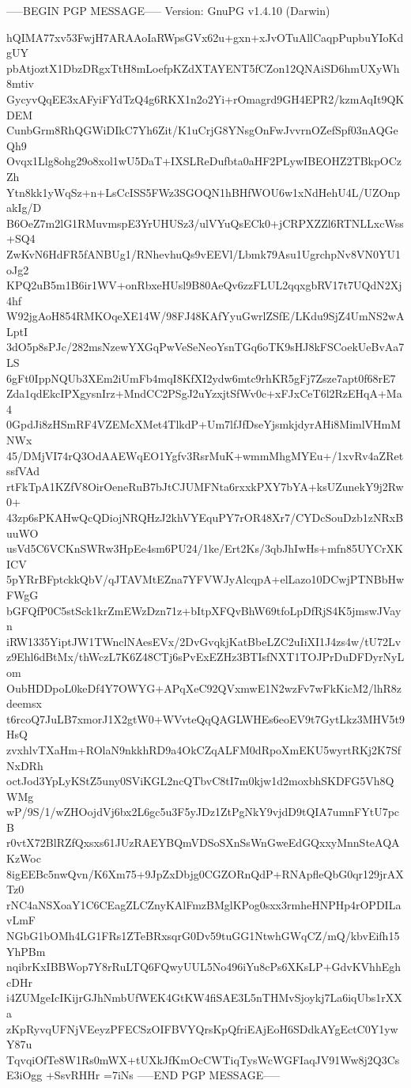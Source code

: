 -----BEGIN PGP MESSAGE-----
Version: GnuPG v1.4.10 (Darwin)

hQIMA77xv53FwjH7ARAAoIaRWpsGVx62u+gxn+xJvOTuAllCaqpPupbuYIoKdgUY
pbAtjoztX1DbzDRgxTtH8mLoefpKZdXTAYENT5fCZon12QNAiSD6hmUXyWh8mtiv
GycyvQqEE3xAFyiFYdTzQ4g6RKX1n2o2Yi+rOmagrd9GH4EPR2/kzmAqIt9QKDEM
CunbGrm8RhQGWiDIkC7Yh6Zit/K1uCrjG8YNsgOnFwJvvrnOZefSpf03nAQGeQh9
Ovqx1Llg8ohg29o8xol1wU5DaT+IXSLReDufbta0aHF2PLywIBEOHZ2TBkpOCzZh
Ytn8kk1yWqSz+n+LsCcISS5FWz3SGOQN1hBHfWOU6w1xNdHehU4L/UZOnpakIg/D
B6OeZ7m2lG1RMuvmspE3YrUHUSz3/ulVYuQsECk0+jCRPXZZl6RTNLLxcWss+SQ4
ZwKvN6HdFR5fANBUg1/RNhevhuQs9vEEVl/Lbmk79Asu1UgrchpNv8VN0YU1oJg2
KPQ2uB5m1B6ir1WV+onRbxeHUsl9B80AeQv6zzFLUL2qqxgbRV17t7UQdN2Xj4hf
W92jgAoH854RMKOqeXE14W/98FJ48KAfYyuGwrlZSfE/LKdu9SjZ4UmNS2wALptI
3dO5p8sPJc/282msNzewYXGqPwVeSeNeoYsnTGq6oTK9sHJ8kFSCoekUeBvAa7LS
6gFt0IppNQUb3XEm2iUmFb4mqI8KfXI2ydw6mtc9rhKR5gFj7Zsze7apt0f68rE7
Zda1qdEkcIPXgysnIrz+MndCC2PSgJ2uYzxjtSfWv0c+xFJxCeT6l2RzEHqA+Ma4
0GpdJi8zHSmRF4VZEMcXMet4TlkdP+Um7lfJfDseYjsmkjdyrAHi8MimlVHmMNWx
45/DMjVI74rQ3OdAAEWqEO1Ygfv3RsrMuK+wmmMhgMYEu+/1xvRv4aZRetssfVAd
rtFkTpA1KZfV8OirOeneRuB7bJtCJUMFNta6rxxkPXY7bYA+ksUZunekY9j2Rw0+
43zp6sPKAHwQcQDiojNRQHzJ2khVYEquPY7rOR48Xr7/CYDcSouDzb1zNRxBuuWO
usVd5C6VCKnSWRw3HpEe4sm6PU24/1ke/Ert2Ks/3qbJhIwHs+mfn85UYCrXKICV
5pYRrBFptckkQbV/qJTAVMtEZna7YFVWJyAlcqpA+elLazo10DCwjPTNBbHwFWgG
bGFQfP0C5stSck1krZmEWzDzn71z+bItpXFQvBhW69tfoLpDfRjS4K5jmswJVayn
iRW1335YiptJW1TWnclNAesEVx/2DvGvqkjKatBbeLZC2uIiXI1J4zs4w/tU72Lv
z9Ehl6dBtMx/thWczL7K6Z48CTj6sPvExEZHz3BTIsfNXT1TOJPrDuDFDyrNyLom
OubHDDpoL0keDf4Y7OWYG+APqXeC92QVxmwE1N2wzFv7wFkKicM2/lhR8zdeemsx
t6rcoQ7JuLB7xmorJ1X2gtW0+WVvteQqQAGLWHEs6eoEV9t7GytLkz3MHV5t9HsQ
zvxhlvTXaHm+ROlaN9nkkhRD9a4OkCZqALFM0dRpoXmEKU5wyrtRKj2K7SfNxDRh
octJod3YpLyKStZ5uny0SViKGL2ncQTbvC8tI7m0kjw1d2moxbhSKDFG5Vh8QWMg
wP/9S/1/wZHOojdVj6bx2L6gc5u3F5yJDz1ZtPgNkY9vjdD9tQIA7umnFYtU7pcB
r0vtX72BlRZfQxsxs61JUzRAEYBQmVDSoSXnSsWnGweEdGQxxyMnnSteAQAKzWoc
8igEEBc5nwQvn/K6Xm75+9JpZxDbjg0CGZORnQdP+RNApfleQbG0qr129jrAXTz0
rNC4aNSXoaY1C6CEagZLCZnyKAlFmzBMglKPog0sxx3rmheHNPHp4rOPDILavLmF
NGbG1bOMh4LG1FRs1ZTeBRxsqrG0Dv59tuGG1NtwhGWqCZ/mQ/kbvEifh15YhPBm
nqibrKxIBBWop7Y8rRuLTQ6FQwyUUL5No496iYu8cPs6XKsLP+GdvKVhhEghcDHr
i4ZUMgeIcIKijrGJhNmbUfWEK4GtKW4fiSAE3L5nTHMvSjoykj7La6iqUbs1rXXa
zKpRyvqUFNjVEeyzPFECSzOIFBVYQrsKpQfriEAjEoH6SDdkAYgEctC0Y1ywY87u
TqvqiOfTe8W1Rs0mWX+tUXkJfKmOcCWTiqTysWcWGFIaqJV91Ww8j2Q3CsE3iOgg
+SsvRHHr
=7iNs
-----END PGP MESSAGE-----
